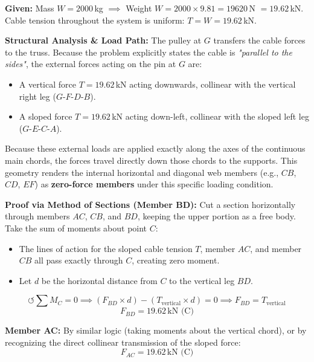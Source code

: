 \documentclass[12pt,a3paper]{article}
\begin{document}
\begin{enumerate}
\begin{tcolorbox}[enhanced,breakable,ansbox,colback=cE!4,colframe=cE,
  boxrule=0.8pt,arc=5pt,
  title={\textbf{Expanded Solution}},fonttitle=\bfseries\color{white},colbacktitle=cE]

\textbf{Given:}
Mass $W = 2000$\,kg $\implies$ Weight $W = 2000 \times 9.81 = 19620$\,N $= 19.62$\,kN.\\
Cable tension throughout the system is uniform: $T = W = 19.62$\,kN.

\medskip
\textbf{Structural Analysis \& Load Path:}
The pulley at $G$ transfers the cable forces to the truss. Because the problem explicitly states the cable is \textit{"parallel to the sides"}, the external forces acting on the pin at $G$ are:
\begin{itemize}
    \item A vertical force $T = 19.62$\,kN acting downwards, collinear with the vertical right leg ($G$-$F$-$D$-$B$).
    \item A sloped force $T = 19.62$\,kN acting down-left, collinear with the sloped left leg ($G$-$E$-$C$-$A$).
\end{itemize}

Because these external loads are applied exactly along the axes of the continuous main chords, the forces travel directly down those chords to the supports. This geometry renders the internal horizontal and diagonal web members (e.g., $CB$, $CD$, $EF$) as \textbf{zero-force members} under this specific loading condition.

\medskip
\textbf{Proof via Method of Sections (Member BD):}
Cut a section horizontally through members $AC$, $CB$, and $BD$, keeping the upper portion as a free body. Take the sum of moments about point $C$:
\begin{itemize}
    \item The lines of action for the sloped cable tension $T$, member $AC$, and member $CB$ all pass exactly through $C$, creating zero moment.
    \item Let $d$ be the horizontal distance from $C$ to the vertical leg $BD$. 
\end{itemize}
\[
  \circlearrowleft \sum M_C = 0 \implies (F_{BD} \times d) - (T_{\text{vertical}} \times d) = 0 \implies F_{BD} = T_{\text{vertical}}
\]
\[
  \boxed{F_{BD} = 19.62\,\text{kN (C)}}
\]

\medskip
\textbf{Member AC:} 
By similar logic (taking moments about the vertical chord), or by recognizing the direct collinear transmission of the sloped force:
\[
  \boxed{F_{AC} = 19.62\,\text{kN (C)}}
\]


\end{tcolorbox}
\end{enumerate}
\end{document}
